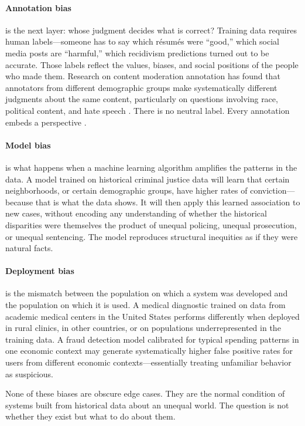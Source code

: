 \paragraph{Annotation bias} is the next layer: whose judgment decides what is correct? Training data requires human labels---someone has to say which r\'{e}sum\'{e}s were ``good,'' which social media posts are ``harmful,'' which recidivism predictions turned out to be accurate. Those labels reflect the values, biases, and social positions of the people who made them. Research on content moderation annotation has found that annotators from different demographic groups make systematically different judgments about the same content, particularly on questions involving race, political content, and hate speech \autocite{sap2019risk}. There is no neutral label. Every annotation embeds a perspective \autocite{bender2021stochastic}.

\paragraph{Model bias} is what happens when a machine learning algorithm amplifies the patterns in the data. A model trained on historical criminal justice data will learn that certain neighborhoods, or certain demographic groups, have higher rates of conviction---because that is what the data shows. It will then apply this learned association to new cases, without encoding any understanding of whether the historical disparities were themselves the product of unequal policing, unequal prosecution, or unequal sentencing. The model reproduces structural inequities as if they were natural facts.

\paragraph{Deployment bias} is the mismatch between the population on which a system was developed and the population on which it is used. A medical diagnostic \ai trained on data from academic medical centers in the United States performs differently when deployed in rural clinics, in other countries, or on populations underrepresented in the training data. A fraud detection model calibrated for typical spending patterns in one economic context may generate systematically higher false positive rates for users from different economic contexts---essentially treating unfamiliar behavior as suspicious.

\begin{keyconcept}
None of these biases are obscure edge cases. They are the normal condition of \ai systems built from historical data about an unequal world. The question is not whether they exist but what to do about them.
\end{keyconcept}

